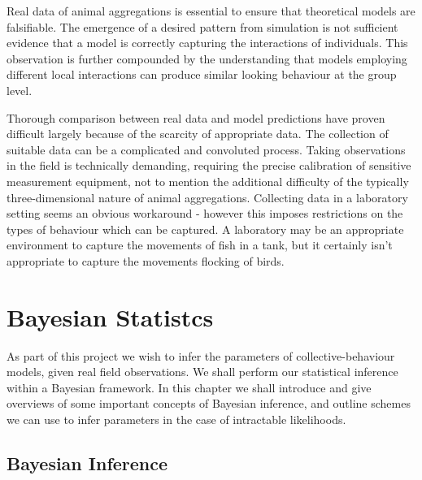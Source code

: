 Real data of animal aggregations is essential to ensure that theoretical models are falsifiable. The emergence of a desired pattern from simulation is not sufficient evidence that a model is correctly capturing the interactions of individuals. This observation is further compounded by the understanding that models employing different local interactions can produce similar looking behaviour at the group level.

Thorough comparison between real data and model predictions have proven difficult largely because of the scarcity of appropriate data. The collection of suitable data can be a complicated and convoluted process. Taking observations in the field is technically demanding, requiring the precise calibration of sensitive measurement equipment, not to mention the additional difficulty of the typically three-dimensional nature of animal aggregations. Collecting data in a laboratory setting seems an obvious workaround - however this imposes restrictions on the types of behaviour which can be captured. A laboratory may be an appropriate environment to capture the movements of fish in a tank, but it certainly isn't appropriate to capture the movements flocking of birds.


\section{Bayesian Statistcs}	
\label{sec:bayes_intro}

As part of this project we wish to infer the parameters of collective-behaviour models, given real field observations. We shall perform our statistical inference within a Bayesian framework. In this chapter we shall introduce and give overviews of some important concepts of Bayesian inference, and outline schemes we can use to infer parameters in the case of intractable likelihoods.

\subsection{Bayesian Inference}
\label{ssec:bayes}

